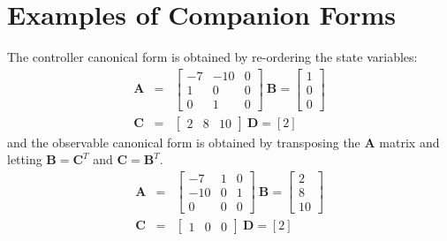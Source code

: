 \begin{slide}
\label{slide:l5s} 
\end{slide}

\section*{Examples of Companion Forms}
\ifslidesonly
\begin{slide}

\end{slide}
\fi

The controller canonical form is obtained by re-ordering the state
variables:
\begin{eqnarray*}\mathbf{A} & = & \left[\begin{array}{ccc}
  -7 & -10 & 0 \\
  1 & 0 & 0 \\
  0 & 1 & 0
\end{array}\right]\ \mathbf{B}=\left[\begin{array}{c}
  1 \\
  0 \\
  0
\end{array}\right]\\ \mathbf{C} & = & \left[\begin{array}{ccc}
  2 & 8 & 10
\end{array}\right]\ \mathbf{D}=\left[2\right]\end{eqnarray*}
and the observable canonical form is obtained by transposing the
$\mathbf{A}$ matrix and letting $\mathbf{B} = \mathbf{C}^T$ and
$\mathbf{C}=\mathbf{B}^T$.
\begin{eqnarray*}\mathbf{A} & = & \left[\begin{array}{ccc}
  -7 & 1 & 0 \\
  -10 & 0 & 1 \\
  0 & 0 & 0
\end{array}\right]\ \mathbf{B}=\left[\begin{array}{c}
  2 \\
  8 \\
  10
\end{array}\right]\\ \mathbf{C} & = & \left[\begin{array}{ccc}
  1 & 0 & 0
\end{array}\right]\ \mathbf{D}=\left[2\right]\end{eqnarray*}
